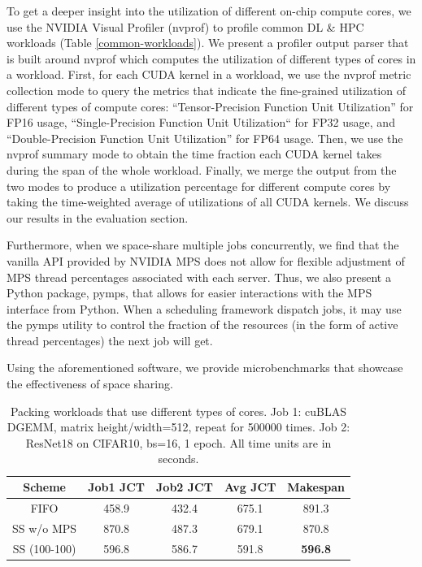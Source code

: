 \documentclass{article}
\begin{document}
To get a deeper insight into the utilization of different on-chip compute cores, we use the NVIDIA Visual Profiler (nvprof) to profile common DL & HPC workloads (Table \ref{common-workloads}). We present a profiler output parser that is built around nvprof which computes the utilization of different types of cores in a workload. First, for each CUDA kernel in a workload, we use the nvprof metric collection mode to query the metrics that indicate the fine-grained utilization of different types of compute cores: “Tensor-Precision Function Unit Utilization” for FP16 usage, “Single-Precision Function Unit Utilization“ for FP32 usage, and “Double-Precision Function Unit Utilization” for FP64 usage. Then, we use the nvprof summary mode to obtain the time fraction each CUDA kernel takes during the span of the whole workload. Finally, we merge the output from the two modes to produce a utilization percentage for different compute cores by taking the time-weighted average of utilizations of all CUDA kernels. We discuss our results in the evaluation section.

Furthermore, when we space-share multiple jobs concurrently, we find that the vanilla API provided by NVIDIA MPS does not allow for flexible adjustment of MPS thread percentages associated with each server. Thus, we also present a Python package, pymps, that allows for easier interactions with the MPS interface from Python. When a scheduling framework dispatch jobs, it may use the pymps utility to control the fraction of the resources (in the form of active thread percentages) the next job will get.

Using the aforementioned software, we provide microbenchmarks that showcase the effectiveness of space sharing.


\begin{table}[t]
\small
\label{pack-different-cores}
\vskip 0.15in
\begin{center}
\begin{tabular*}{0.5\textwidth}{ccccc}
\toprule
Scheme & Job1 JCT & Job2 JCT & Avg JCT & Makespan \\
\midrule
FIFO & 458.9 & 432.4 & 675.1 & 891.3 \\
SS w/o MPS & 870.8 & 487.3 & 679.1 & 870.8 \\
SS (100-100) & 596.8 & 586.7 & 591.8 & \textbf{596.8} \\
\bottomrule
\end{tabular*}
\end{center}
\caption{Packing workloads that use different types of cores. Job 1: cuBLAS DGEMM, matrix height/width=512, repeat for 500000 times. Job 2: ResNet18 on CIFAR10, bs=16, 1 epoch. All time units are in seconds.}
\vskip -0.1in
\end{table}
\end{document}
